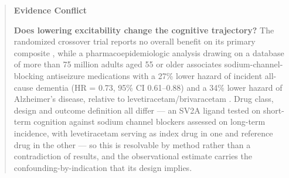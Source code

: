\documentclass[11pt]{article}
\begin{document}
\begin{quote}
\noindent\textbf{Evidence Conflict}\par
\textbf{Does lowering excitability change the cognitive trajectory?} The randomized crossover trial reports no overall benefit on its primary composite \citep{Vossel2021}, while a pharmacoepidemiologic analysis drawing on a database of more than 75 million adults aged 55 or older associates sodium-channel-blocking antiseizure medications with a 27\% lower hazard of incident all-cause dementia (HR = 0.73, 95\% CI 0.61--0.88) and a 34\% lower hazard of Alzheimer's disease, relative to levetiracetam/brivaracetam \citep{FerreiraAtuesta2026}. Drug class, design and outcome definition all differ --- an SV2A ligand tested on short-term cognition against sodium channel blockers assessed on long-term incidence, with levetiracetam serving as index drug in one and reference drug in the other --- so this is resolvable by method rather than a contradiction of results, and the observational estimate carries the confounding-by-indication that its design implies.

\end{quote}
\end{document}
